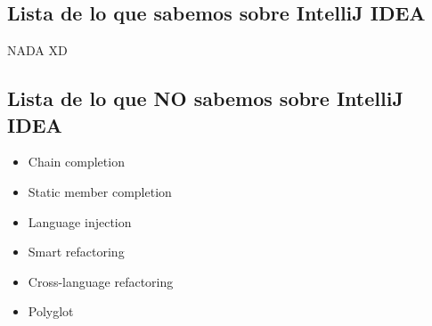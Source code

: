 \documentclass{article}
\begin{document}
        \subsection{Lista de lo que sabemos sobre IntelliJ IDEA}
          NADA XD
        \subsection{Lista de lo que NO sabemos sobre IntelliJ IDEA}
          \begin{itemize}
            \item Chain completion
            \item Static member completion
            \item Language injection
            \item Smart refactoring
            \item Cross-language refactoring
            \item Polyglot
          \end{itemize}
        
\end{document}
